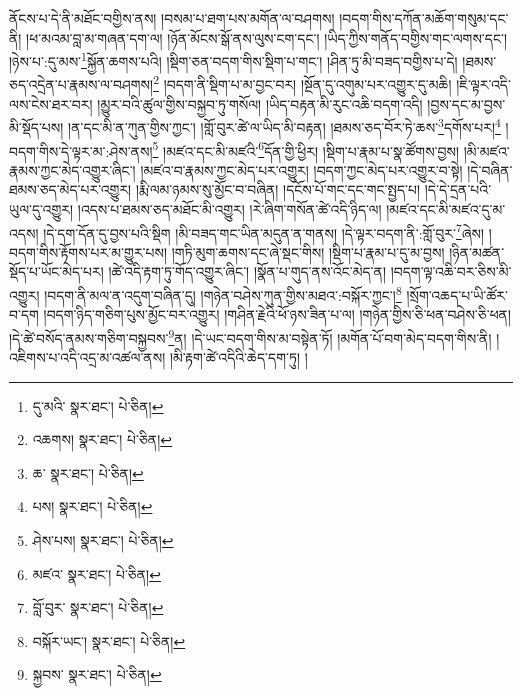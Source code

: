 ནོངས་པ་དེ་ནི་མཐོང་བགྱིས་ནས། །བསམ་པ་ཐག་པས་མགོན་ལ་བཤགས། །བདག་གིས་དཀོན་མཆོག་གསུམ་དང་ནི། །ཕ་མའམ་བླ་མ་གཞན་དག་ལ། །ཉོན་མོངས་སྒོ་ནས་ལུས་ངག་དང་། །ཡིད་ཀྱིས་གནོད་བགྱིས་གང་ལགས་དང་། །ཉེས་པ་:དུ་མས་\footnote{དུ་མའི་  སྣར་ཐང་།  པེ་ཅིན། }སྐྱོན་ཆགས་པའི། །སྡིག་ཅན་བདག་གིས་སྡིག་པ་གང་། །ཤིན་ཏུ་མི་བཟད་བགྱིས་པ་དེ། །ཐམས་ཅད་འདྲེན་པ་རྣམས་ལ་བཤགས།\footnote{འཆགས།  སྣར་ཐང་།  པེ་ཅིན། } །བདག་ནི་སྡིག་པ་མ་བྱང་བར། །སྔོན་དུ་འགུམ་པར་འགྱུར་དུ་མཆི། །ཇི་ལྟར་འདི་ལས་ངེས་ཐར་བར། །མྱུར་བའི་ཚུལ་གྱིས་བསྐྱབ་ཏུ་གསོལ། །ཡིད་བརྟན་མི་རུང་འཆི་བདག་འདི། །བྱས་དང་མ་བྱས་མི་སྡོད་པས། །ན་དང་མི་ན་ཀུན་གྱིས་ཀྱང་། །གློ་བུར་ཚེ་ལ་ཡིད་མི་བརྟན། །ཐམས་ཅད་བོར་ཏེ་ཆས་\footnote{ཆ་  སྣར་ཐང་།  པེ་ཅིན། }དགོས་པར།\footnote{པས།  སྣར་ཐང་།  པེ་ཅིན། } །བདག་གིས་དེ་ལྟར་མ་:ཤེས་ནས།\footnote{ཤེས་པས།  སྣར་ཐང་།  པེ་ཅིན། } །མཛའ་དང་མི་མཛའི་\footnote{མཛའ་  སྣར་ཐང་།  པེ་ཅིན། }དོན་གྱི་ཕྱིར། །སྡིག་པ་རྣམ་པ་སྣ་ཚོགས་བྱས། །མི་མཛའ་རྣམས་ཀྱང་མེད་འགྱུར་ཞིང་། །མཛའ་བ་རྣམས་ཀྱང་མེད་པར་འགྱུར། །བདག་ཀྱང་མེད་པར་འགྱུར་བ་སྟེ། །དེ་བཞིན་ཐམས་ཅད་མེད་པར་འགྱུར། །རྨི་ལམ་ཉམས་སུ་མྱོང་བ་བཞིན། །དངོས་པོ་གང་དང་གང་སྤྱད་པ། །དེ་དེ་དྲན་པའི་ཡུལ་དུ་འགྱུར། །འདས་པ་ཐམས་ཅད་མཐོང་མི་འགྱུར། །རེ་ཞིག་གསོན་ཚེ་འདི་ཉིད་ལ། །མཛའ་དང་མི་མཛའ་དུ་མ་འདས། །དེ་དག་དོན་དུ་བྱས་པའི་སྡིག །མི་བཟད་གང་ཡིན་མདུན་ན་གནས། །དེ་ལྟར་བདག་ནི་:གློ་བུར་\footnote{བློ་བུར་  སྣར་ཐང་།  པེ་ཅིན། }ཞེས། །བདག་གིས་རྟོགས་པར་མ་གྱུར་པས། །གཏི་མུག་ཆགས་དང་ཞེ་སྡང་གིས། །སྡིག་པ་རྣམ་པ་དུ་མ་བྱས། །ཉིན་མཚན་སྡོད་པ་ཡོང་མེད་པར། །ཚེ་འདི་རྟག་ཏུ་གོད་འགྱུར་ཞིང་། །སྣོན་པ་གུད་ནས་འོང་མེད་ན། །བདག་ལྟ་འཆི་བར་ཅིས་མི་འགྱུར། །བདག་ནི་མལ་ན་འདུག་བཞིན་དུ། །གཉེན་བཤེས་ཀུན་གྱིས་མཐའ་:བསྐོར་ཀྱང་།\footnote{བསྐོར་ཡང་།  སྣར་ཐང་།  པེ་ཅིན། } །སྲོག་འཆད་པ་ཡི་ཚོར་བ་དག །བདག་ཉིད་གཅིག་པུས་མྱོང་བར་འགྱུར། །གཤིན་རྗེའི་ཕོ་ཉས་ཟིན་པ་ལ། །གཉེན་གྱིས་ཅི་ཕན་བཤེས་ཅི་ཕན། །དེ་ཚེ་བསོད་ནམས་གཅིག་བསྐྱབས་\footnote{སྐྱབས་  སྣར་ཐང་།  པེ་ཅིན། }ན། །དེ་ཡང་བདག་གིས་མ་བསྟེན་ཏོ། །མགོན་པོ་བག་མེད་བདག་གིས་ནི། །འཇིགས་པ་འདི་འདྲ་མ་འཚལ་ནས། །མི་རྟག་ཚེ་འདིའི་ཆེད་དག་ཏུ། །
